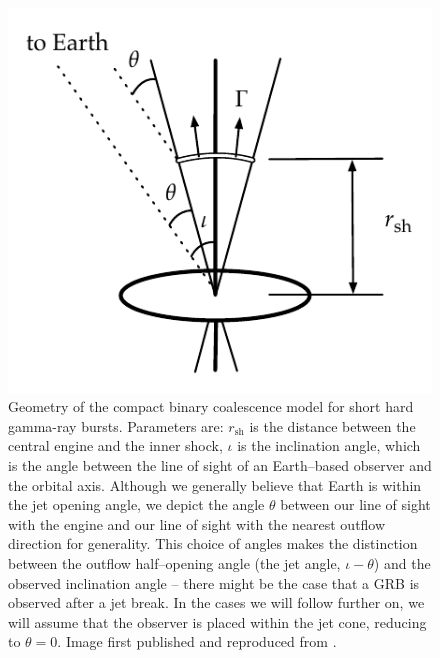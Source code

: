 \begin{figure}
\centering
\includegraphics{Images/CBC_geometry}
\caption[Geometry of the compact binary coalescence model of short GRBs]
{Geometry of the compact binary coalescence model for short hard gamma-ray bursts.
Parameters are: $r_\mathrm{sh}$ is the distance between the central engine and the inner
shock, $\iota$ is the inclination angle, which is the angle between the
line of sight of an Earth--based observer and the orbital axis.
Although we generally believe that Earth is within the jet opening angle,
we depict the angle $\theta$ between our line of sight with the engine
and our line of sight with the nearest outflow direction for generality. This choice of angles makes the distinction between the outflow half--opening angle (the jet angle, $\iota - \theta$) and the observed inclination angle -- there might be the case that a GRB is observed after a jet break. In the cases we will follow further on, we will assume that the observer is placed within the jet cone, reducing to $\theta=0$. Image first published and reproduced from \cite{NickThesis}.}
\label{fig:internal_shock_geometry}
\end{figure}

